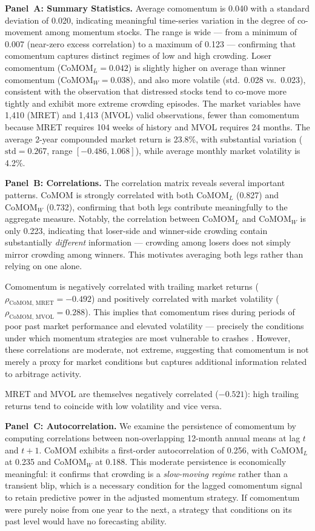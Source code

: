 \documentclass[10pt]{article}
\begin{document}


\textbf{Panel~A: Summary Statistics.} Average comomentum is 0.040 with a standard deviation of 0.020, indicating meaningful time-series variation in the degree of co-movement among momentum stocks. The range is wide --- from a minimum of 0.007 (near-zero excess correlation) to a maximum of 0.123 --- confirming that comomentum captures distinct regimes of low and high crowding. Loser comomentum (CoMOM$_L = 0.042$) is slightly higher on average than winner comomentum (CoMOM$_W = 0.038$), and also more volatile (std.\ 0.028 vs.\ 0.023), consistent with the observation that distressed stocks tend to co-move more tightly and exhibit more extreme crowding episodes. The market variables have 1{,}410 (MRET) and 1{,}413 (MVOL) valid observations, fewer than comomentum because MRET requires 104 weeks of history and MVOL requires 24 months. The average 2-year compounded market return is 23.8\%, with substantial variation ($\text{std} = 0.267$, range $[-0.486, 1.068]$), while average monthly market volatility is 4.2\%.

\textbf{Panel~B: Correlations.} The correlation matrix reveals several important patterns. CoMOM is strongly correlated with both CoMOM$_L$ (0.827) and CoMOM$_W$ (0.732), confirming that both legs contribute meaningfully to the aggregate measure. Notably, the correlation between CoMOM$_L$ and CoMOM$_W$ is only 0.223, indicating that loser-side and winner-side crowding contain substantially \emph{different} information --- crowding among losers does not simply mirror crowding among winners. This motivates averaging both legs rather than relying on one alone.

Comomentum is negatively correlated with trailing market returns ($\rho_{\text{CoMOM, MRET}} = -0.492$) and positively correlated with market volatility ($\rho_{\text{CoMOM, MVOL}} = 0.288$). This implies that comomentum rises during periods of poor past market performance and elevated volatility --- precisely the conditions under which momentum strategies are most vulnerable to crashes \citep{Asness2013}. However, these correlations are moderate, not extreme, suggesting that comomentum is not merely a proxy for market conditions but captures additional information related to arbitrage activity.

MRET and MVOL are themselves negatively correlated ($-0.521$): high trailing returns tend to coincide with low volatility and vice versa.

\textbf{Panel~C: Autocorrelation.} We examine the persistence of comomentum by computing correlations between non-overlapping 12-month annual means at lag $t$ and $t+1$. CoMOM exhibits a first-order autocorrelation of 0.256, with CoMOM$_L$ at 0.235 and CoMOM$_W$ at 0.188. This moderate persistence is economically meaningful: it confirms that crowding is a \emph{slow-moving regime} rather than a transient blip, which is a necessary condition for the lagged comomentum signal to retain predictive power in the adjusted momentum strategy. If comomentum were purely noise from one year to the next, a strategy that conditions on its past level would have no forecasting ability.
\end{document}
